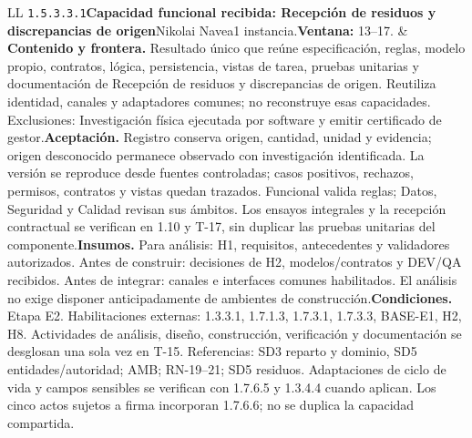 \begin{longtable}{L{\tabcolsep\relax}L{\tabcolsep\relax}}
\texttt{1.\allowbreak{}5.\allowbreak{}3.\allowbreak{}3.\allowbreak{}1}\newline{}\textbf{Capacidad funcional recibida: Recepción de residuos y discrepancias de origen}\newline{}Nikolai Navea\newline{}1 instancia.\newline{}\textbf{Ventana:} 13--17. & \textbf{Contenido y frontera.} Resultado único que reúne especificación, reglas, modelo propio, contratos, lógica, persistencia, vistas de tarea, pruebas unitarias y documentación de Recepción de residuos y discrepancias de origen. Reutiliza identidad, canales y adaptadores comunes; no reconstruye esas capacidades. Exclusiones: Investigación física ejecutada por software y emitir certificado de gestor.\newline{}\textbf{Aceptación.} Registro conserva origen, cantidad, unidad y evidencia; origen desconocido permanece observado con investigación identificada. La versión se reproduce desde fuentes controladas; casos positivos, rechazos, permisos, contratos y vistas quedan trazados. Funcional valida reglas; Datos, Seguridad y Calidad revisan sus ámbitos. Los ensayos integrales y la recepción contractual se verifican en 1.10 y T-17, sin duplicar las pruebas unitarias del componente.\newline{}\textbf{Insumos.} Para análisis: H1, requisitos, antecedentes y validadores autorizados. Antes de construir: decisiones de H2, modelos/contratos y DEV/QA recibidos. Antes de integrar: canales e interfaces comunes habilitados. El análisis no exige disponer anticipadamente de ambientes de construcción.\newline{}\textbf{Condiciones.} Etapa E2. Habilitaciones externas: 1.3.3.1, 1.7.1.3, 1.7.3.1, 1.7.3.3, BASE-E1, H2, H8. Actividades de análisis, diseño, construcción, verificación y documentación se desglosan una sola vez en T-15. Referencias: SD3 reparto y dominio, SD5 entidades/autoridad; AMB; RN-19--21; SD5 residuos. Adaptaciones de ciclo de vida y campos sensibles se verifican con 1.7.6.5 y 1.3.4.4 cuando aplican. Los cinco actos sujetos a firma incorporan 1.7.6.6; no se duplica la capacidad compartida.\\\hline

\end{longtable}
